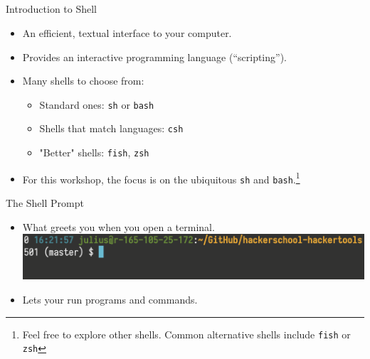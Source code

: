 \documentclass[12pt]{beamer}
\begin{document}
\subsection{}
\begin{frame}{Introduction to Shell}
  \begin{itemize}
    \item An efficient, textual interface to your computer.
    \item Provides an interactive programming language (``scripting'').
    \item Many shells to choose from:
          \begin{itemize}
            \item Standard ones: \texttt{sh} or \texttt{bash}
            \item Shells that match languages: \texttt{csh}
            \item "Better" shells: \texttt{fish}, \texttt{zsh}
          \end{itemize}
    \item For this workshop, the focus is on the ubiquitous \texttt{sh} and \texttt{bash}.\footnote{Feel free to explore other shells. Common alternative shells include \texttt{fish} or \texttt{zsh}}
  \end{itemize}
\end{frame}

\begin{frame}{The Shell Prompt}
  \begin{itemize}
    \item What greets you when you open a terminal.
          \includegraphics[width=\linewidth]{shell-prompt}
    \item Lets your run programs and commands.
  \end{itemize}
\end{frame}
\end{document}

